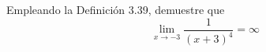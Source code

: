 \item Empleando la Definición 3.39, demuestre que 
    $$\lim_{x \to -3} \frac{1}{(x + 3)^4} = \infty$$
